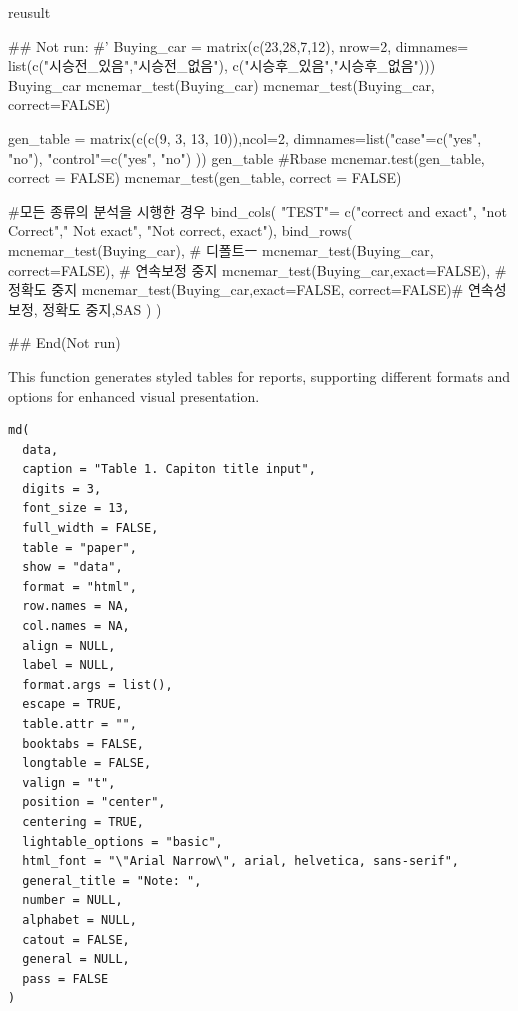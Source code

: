 \documentclass[a4paper]{book}
\begin{document}
%
\begin{Value}
reusult
\end{Value}
%
\begin{Examples}
\begin{ExampleCode}

## Not run: 
#'
Buying_car  = matrix(c(23,28,7,12), nrow=2,
                     dimnames= list(c("시승전_있음","시승전_없음"),
                                    c("시승후_있음","시승후_없음")))
Buying_car
mcnemar_test(Buying_car)
mcnemar_test(Buying_car, correct=FALSE)

gen_table = matrix(c(c(9, 3, 13, 10)),ncol=2,
                   dimnames=list("case"=c("yes", "no"),
                                 "control"=c("yes", "no")   ))
gen_table
#Rbase
mcnemar.test(gen_table, correct = FALSE)
mcnemar_test(gen_table, correct = FALSE)



#모든 종류의 분석을 시행한 경우
bind_cols(
  "TEST"= c("correct and exact", "not Correct"," Not exact", "Not correct, exact"),
  bind_rows(
    mcnemar_test(Buying_car),  # 디폴트ㅡ
    mcnemar_test(Buying_car, correct=FALSE), # 연속보정 중지
    mcnemar_test(Buying_car,exact=FALSE), # 정확도 중지
    mcnemar_test(Buying_car,exact=FALSE, correct=FALSE)# 연속성 보정, 정확도 중지,SAS
  )
)%

## End(Not run)
\end{ExampleCode}
\end{Examples}
%
\begin{Description}
This function generates styled tables for reports, supporting different formats and options for enhanced visual presentation.
\end{Description}
%
\begin{Usage}
\begin{verbatim}
md(
  data,
  caption = "Table 1. Capiton title input",
  digits = 3,
  font_size = 13,
  full_width = FALSE,
  table = "paper",
  show = "data",
  format = "html",
  row.names = NA,
  col.names = NA,
  align = NULL,
  label = NULL,
  format.args = list(),
  escape = TRUE,
  table.attr = "",
  booktabs = FALSE,
  longtable = FALSE,
  valign = "t",
  position = "center",
  centering = TRUE,
  lightable_options = "basic",
  html_font = "\"Arial Narrow\", arial, helvetica, sans-serif",
  general_title = "Note: ",
  number = NULL,
  alphabet = NULL,
  catout = FALSE,
  general = NULL,
  pass = FALSE
)
\end{verbatim}
\end{Usage}
\end{document}
